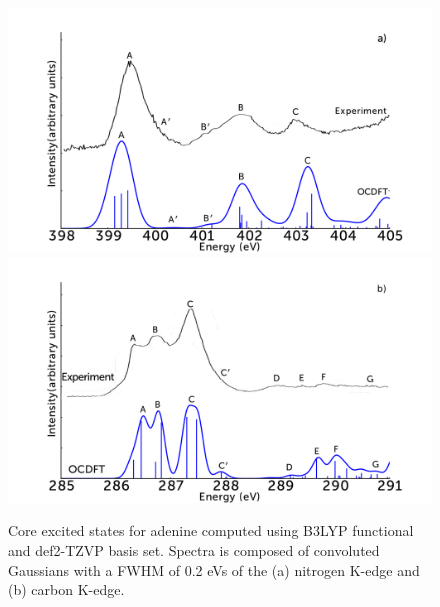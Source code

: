 \documentclass[11.5pt]{article}
\begin{document}
\begin{figure}[!ht]
\includegraphics[scale=0.20]{AdenineNKexperiment.png} \\
\includegraphics[scale=0.20]{AdenineCKexperiment.png}
\caption{Core excited states for adenine computed using B3LYP functional and def2-TZVP basis set. Spectra is composed of convoluted Gaussians with a FWHM of 0.2 eVs of the (a) nitrogen K-edge and (b) carbon K-edge.}
\label{figure:Adenine}
\end{figure}
\end{document}
